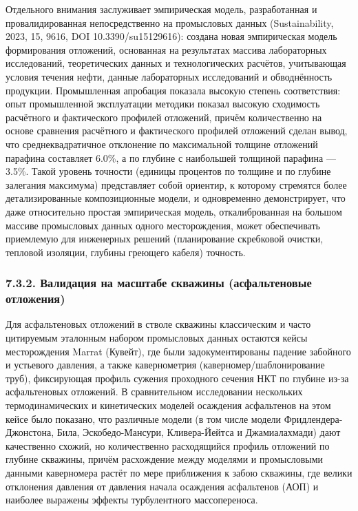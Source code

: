 \documentclass[11pt]{extarticle}
\begin{document}
Отдельного внимания заслуживает эмпирическая модель, разработанная и провалидированная непосредственно на промысловых данных (Sustainability, 2023, 15, 9616, DOI 10.3390/su15129616): создана новая эмпирическая модель формирования отложений, основанная на результатах массива лабораторных исследований, теоретических данных и технологических расчётов, учитывающая условия течения нефти, данные лабораторных исследований и обводнённость продукции. Промышленная апробация показала высокую степень соответствия: опыт промышленной эксплуатации методики показал высокую сходимость расчётного и фактического профилей отложений, причём количественно на основе сравнения расчётного и фактического профилей отложений сделан вывод, что среднеквадратичное отклонение по максимальной толщине отложений парафина составляет 6.0\%, а по глубине с наибольшей толщиной парафина --- 3.5\%. Такой уровень точности (единицы процентов по толщине и по глубине залегания максимума) представляет собой ориентир, к которому стремятся более детализированные композиционные модели, и одновременно демонстрирует, что даже относительно простая эмпирическая модель, откалиброванная на большом массиве промысловых данных одного месторождения, может обеспечивать приемлемую для инженерных решений (планирование скребковой очистки, тепловой изоляции, глубины греющего кабеля) точность.

\subsubsection{7.3.2. Валидация на масштабе скважины (асфальтеновые отложения)}\label{ux432ux430ux43bux438ux434ux430ux446ux438ux44f-ux43dux430-ux43cux430ux441ux448ux442ux430ux431ux435-ux441ux43aux432ux430ux436ux438ux43dux44b-ux430ux441ux444ux430ux43bux44cux442ux435ux43dux43eux432ux44bux435-ux43eux442ux43bux43eux436ux435ux43dux438ux44f}

Для асфальтеновых отложений в стволе скважины классическим и часто цитируемым эталонным набором промысловых данных остаются кейсы месторождения Marrat (Кувейт), где были задокументированы падение забойного и устьевого давления, а также кавернометрия (каверномер/шаблонирование труб), фиксирующая профиль сужения проходного сечения НКТ по глубине из-за асфальтеновых отложений. В сравнительном исследовании нескольких термодинамических и кинетических моделей осаждения асфальтенов на этом кейсе было показано, что различные модели (в том числе модели Фридлендера-Джонстона, Била, Эскобедо-Мансури, Кливера-Йейтса и Джамиалахмади) дают качественно схожий, но количественно расходящийся профиль отложений по глубине скважины, причём расхождение между моделями и промысловыми данными каверномера растёт по мере приближения к забою скважины, где велики отклонения давления от давления начала осаждения асфальтенов (АОП) и наиболее выражены эффекты турбулентного массопереноса.
\end{document}
